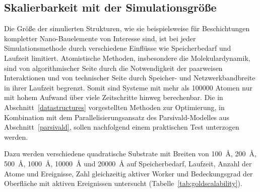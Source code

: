 \begin{comment}
Bei der Analyse der simulierten Strukturen wurde bei Abscheidungen auf glatten Substraten eine Rauheit von \SI{0.12}{\nano\meter} ermittelt, welche nur ca. \SI{10}{\percent} der experimentellen Werte beziehungsweise einer Lage von Goldatomen entspricht.
Strukturierte Substrate zeigen hier höhere Rauheiten, die zwar den experimentell bestimmten Rauheiten entsprechen (Abbildung~\ref{fig:goldroughness}), aber ebenfalls keine Nanopartikel enthalten, sondern aus epitaktisch gewachsenen, monokristallinen Schichten bestehen.
Daran lässt sich erkennen, dass die verwendeten MD-Simulations-Boxen zu klein und die Relaxationszeiten zu kurz sind, um die Bildung von Nanopartikeln darstellen zu können.
Zusätzlich verhindern kleine MD-Boxen in Verbindung mit monokristallinen Substraten die Ausbildung polykristalliner Strukturen, was sich im epitaktischen Wachstum monokristalliner Schichten äußert.
Derartige Finite-Size-Effekte sind Molekulardynamik-Simulationen inhärent, werden jedoch durch Parsivald für einige Systeme zusätzlich verstärkt.
Bei Abscheidung amorpher Schichten, wie für CVD- und ALD-Prozesse üblich, konnte dieser Effekt bisher nicht beobachtet werden (Abschnitt~\ref{siliconpvd}).
Eine Untersuchung einer Abscheidungssimulation auf polykristallinen Gold-Substraten steht noch aus.
\end{comment}

\subsection{Skalierbarkeit mit der Simulationsgröße}
\label{goldscalability}

Die Größe der simulierten Strukturen, wie sie beispielsweise für Beschichtungen kompletter Nano-Bauelemente von Interesse sind, ist bei jeder Simulationsmethode durch verschiedene Einflüsse wie Speicherbedarf und Laufzeit limitiert.
Atomistische Methoden, insbesondere die Molekulardynamik, sind von algorithmischer Seite durch die Notwendigkeit der paarweisen Interaktionen und von technischer Seite durch Speicher- und Netzwerkbandbreite in ihrer Laufzeit begrenzt.
Somit sind Systeme mit mehr als \num{100000} Atomen nur mit hohem Aufwand über viele Zeitschritte hinweg berechenbar.
Die in Abschnitt~\ref{datastructures} vorgestellten Methoden zur Optimierung, in Kombination mit dem Parallelisierungsansatz des Parsivald-Modelles aus Abschnitt~\ref{parsivald}, sollen nachfolgend einem praktischen Test unterzogen werden.

Dazu werden verschiedene quadratische Substrate mit Breiten von \SI{100}{\angstrom}, \SI{200}{\angstrom}, \SI{500}{\angstrom}, \SI{1000}{\angstrom}, \SI{10000}{\angstrom} und \SI{20000}{\angstrom} auf Speicherbedarf, Laufzeit, Anzahl der Atome und Ereignisse, Zahl gleichzeitig aktiver Worker und Bedeckungsgrad der Oberfläche mit aktiven Ereignissen untersucht (Tabelle~\ref{tab:goldscalability}).


